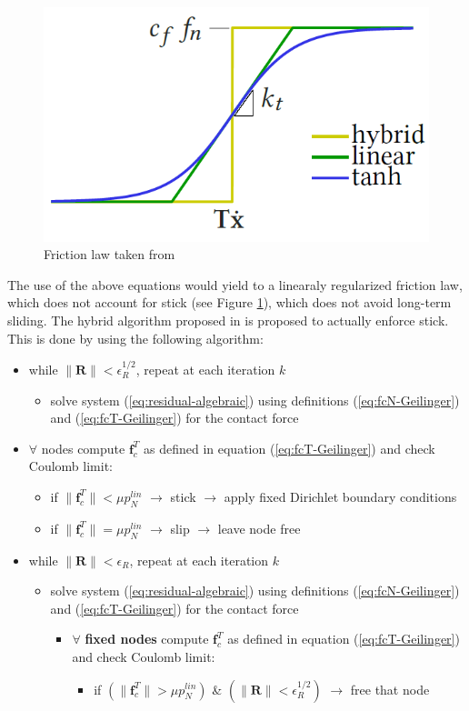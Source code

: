 \documentclass[3p]{elsarticle}
\newcommand{\vect}[1]{\boldsymbol{#1}}
\begin{document}
\begin{figure}[!htbp]
	\centering
	\includegraphics[width=.3\textwidth]{figures/friction_law.png}
	\caption{Friction law taken from \cite{Geilinger2020}}
	\label{fig:friction-law}
\end{figure}

The use of the above equations would yield to a linearaly regularized friction law, which does not account for stick (see Figure \ref{fig:friction-law}), which does not avoid long-term sliding. The hybrid algorithm proposed in \cite{Geilinger2020} is proposed to actually enforce stick. This is done by using the following algorithm:
\newpage
\begin{itemize}
	\item while $\|\vect{R}\|<\epsilon_R^{1/2}$, repeat at each iteration $k$
	\begin{itemize}
		\item solve system (\ref{eq:residual-algebraic}) using definitions (\ref{eq:fcN-Geilinger}) and (\ref{eq:fcT-Geilinger}) for the contact force
	\end{itemize}
	\item $\forall$ nodes compute $\vect{f}_c^T$ as defined in equation (\ref{eq:fcT-Geilinger}) and check Coulomb limit:
	\begin{itemize}
		\item if $\|\vect{f}_c^T\|<\mu p_N^{lin}$ $\rightarrow$ stick $\rightarrow$ apply fixed Dirichlet boundary conditions
		\item if $\|\vect{f}_c^T\|=\mu p_N^{lin}$ $\rightarrow$ slip $\rightarrow$ leave node free 
	\end{itemize}
	\item while $\|\vect{R}\|<\epsilon_R$, repeat at each iteration $k$
	\begin{itemize}
		\item solve system (\ref{eq:residual-algebraic}) using definitions (\ref{eq:fcN-Geilinger}) and (\ref{eq:fcT-Geilinger}) for the contact force
		\begin{itemize}
			\item $\forall$ \textbf{fixed nodes} compute $\vect{f}_c^T$ as defined in equation (\ref{eq:fcT-Geilinger}) and check Coulomb limit:
			\begin{itemize}
				\item if $\left(\|\vect{f}_c^T\|>\mu p_N^{lin}\right)$ \& $(\|\vect{R}\|<\epsilon_R^{1/2})$ $\rightarrow$ free that node
			\end{itemize}	
		\end{itemize}	
	\end{itemize}
\end{itemize}
\end{document}
